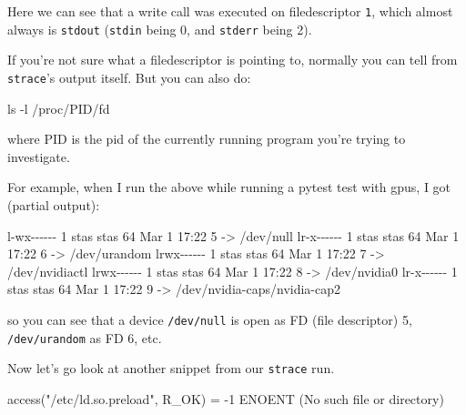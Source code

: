 \documentclass[
]{report}
\newenvironment{Shaded}{\begin{snugshade}}{\end{snugshade}}
\newcommand{\AttributeTok}[1]{\textcolor[rgb]{0.40,0.45,0.13}{#1}}
\newcommand{\ErrorTok}[1]{\textcolor[rgb]{0.68,0.00,0.00}{#1}}
\newcommand{\ExtensionTok}[1]{\textcolor[rgb]{0.00,0.23,0.31}{#1}}
\newcommand{\FunctionTok}[1]{\textcolor[rgb]{0.28,0.35,0.67}{#1}}
\newcommand{\KeywordTok}[1]{\textcolor[rgb]{0.00,0.23,0.31}{#1}}
\newcommand{\NormalTok}[1]{\textcolor[rgb]{0.00,0.23,0.31}{#1}}
\newcommand{\OperatorTok}[1]{\textcolor[rgb]{0.37,0.37,0.37}{#1}}
\newcommand{\StringTok}[1]{\textcolor[rgb]{0.13,0.47,0.30}{#1}}
\begin{document}
Here we can see that a write call was executed on filedescriptor
\texttt{1}, which almost always is \texttt{stdout} (\texttt{stdin} being
0, and \texttt{stderr} being 2).

If you're not sure what a filedescriptor is pointing to, normally you
can tell from \texttt{strace}'s output itself. But you can also do:

\begin{Shaded}
\begin{Highlighting}[]
\FunctionTok{ls} \AttributeTok{{-}l}\NormalTok{ /proc/PID/fd}
\end{Highlighting}
\end{Shaded}

where PID is the pid of the currently running program you're trying to
investigate.

For example, when I run the above while running a pytest test with gpus,
I got (partial output):

\begin{Shaded}
\begin{Highlighting}[]
\ExtensionTok{l{-}wx{-}{-}{-}{-}{-}{-}}\NormalTok{ 1 stas stas 64 Mar  1 17:22 5 }\AttributeTok{{-}}\OperatorTok{\textgreater{}}\NormalTok{ /dev/null}
\ExtensionTok{lr{-}x{-}{-}{-}{-}{-}{-}}\NormalTok{ 1 stas stas 64 Mar  1 17:22 6 }\AttributeTok{{-}}\OperatorTok{\textgreater{}}\NormalTok{ /dev/urandom}
\ExtensionTok{lrwx{-}{-}{-}{-}{-}{-}}\NormalTok{ 1 stas stas 64 Mar  1 17:22 7 }\AttributeTok{{-}}\OperatorTok{\textgreater{}}\NormalTok{ /dev/nvidiactl}
\ExtensionTok{lrwx{-}{-}{-}{-}{-}{-}}\NormalTok{ 1 stas stas 64 Mar  1 17:22 8 }\AttributeTok{{-}}\OperatorTok{\textgreater{}}\NormalTok{ /dev/nvidia0}
\ExtensionTok{lr{-}x{-}{-}{-}{-}{-}{-}}\NormalTok{ 1 stas stas 64 Mar  1 17:22 9 }\AttributeTok{{-}}\OperatorTok{\textgreater{}}\NormalTok{ /dev/nvidia{-}caps/nvidia{-}cap2}
\end{Highlighting}
\end{Shaded}

so you can see that a device \texttt{/dev/null} is open as FD (file
descriptor) 5, \texttt{/dev/urandom} as FD 6, etc.

Now let's go look at another snippet from our \texttt{strace} run.

\begin{Shaded}
\begin{Highlighting}[]
\ExtensionTok{access}\ErrorTok{(}\StringTok{"/etc/ld.so.preload"}\ExtensionTok{,}\NormalTok{ R\_OK}\KeywordTok{)}      \ExtensionTok{=} \AttributeTok{{-}1}\NormalTok{ ENOENT }\ErrorTok{(}\ExtensionTok{No}\NormalTok{ such file or directory}\KeywordTok{)}
\end{Highlighting}
\end{Shaded}
\end{document}
